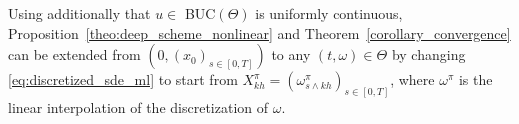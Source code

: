 \documentclass[12pt]{article}
\DeclarePairedDelimiter\floor{\lfloor}{\rfloor}
\numberwithin{equation}{section}
\begin{document}
Using additionally that
$u \in $ BUC$(\Theta)$ is uniformly continuous,
 Proposition~\ref{theo:deep_scheme_nonlinear}
 and Theorem~\ref{corollary_convergence}
 can be extended from $(0, (x_0)_{s \in [0,T]})$ to any $(t, \omega) \in \Theta$
 by changing \eqref{eq:discretized_sde_ml}
to start from $X^\pi_{kh} = (\omega^\pi_{s \land kh})_{s \in [0,T]}$,
where $\omega^\pi$ is the linear interpolation of the
 discretization of $\omega$.
\end{document}
